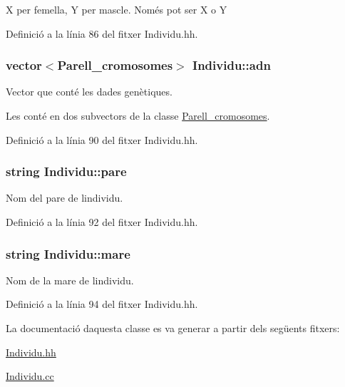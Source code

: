 X per femella, Y per mascle. Només pot ser X o Y 

Definició a la línia 86 del fitxer Individu.\+hh.

\subsubsection[{\texorpdfstring{adn}{adn}}]{\setlength{\rightskip}{0pt plus 5cm}vector$<${\bf Parell\+\_\+cromosomes}$>$ Individu\+::adn\hspace{0.3cm}{\ttfamily [private]}}\hypertarget{class_individu_a9e3ff2f5573b349ddb98dff46b11e143}{}\label{class_individu_a9e3ff2f5573b349ddb98dff46b11e143}


Vector que conté les dades genètiques. 

Les conté en dos subvectors de la classe \hyperlink{class_parell__cromosomes}{Parell\+\_\+cromosomes}. 

Definició a la línia 90 del fitxer Individu.\+hh.

\subsubsection[{\texorpdfstring{pare}{pare}}]{\setlength{\rightskip}{0pt plus 5cm}string Individu\+::pare\hspace{0.3cm}{\ttfamily [private]}}\hypertarget{class_individu_acd37349b1c7db6e07cd88eade7c622c0}{}\label{class_individu_acd37349b1c7db6e07cd88eade7c622c0}


Nom del pare de l\textquotesingle{}individu. 



Definició a la línia 92 del fitxer Individu.\+hh.

\subsubsection[{\texorpdfstring{mare}{mare}}]{\setlength{\rightskip}{0pt plus 5cm}string Individu\+::mare\hspace{0.3cm}{\ttfamily [private]}}\hypertarget{class_individu_ae64702bb96cec3867674fb52d6a310e7}{}\label{class_individu_ae64702bb96cec3867674fb52d6a310e7}


Nom de la mare de l\textquotesingle{}individu. 



Definició a la línia 94 del fitxer Individu.\+hh.



La documentació d\textquotesingle{}aquesta classe es va generar a partir dels següents fitxers\+:\begin{DoxyCompactItemize}
\item 
\hyperlink{_individu_8hh}{Individu.\+hh}\item 
\hyperlink{_individu_8cc}{Individu.\+cc}\end{DoxyCompactItemize}
